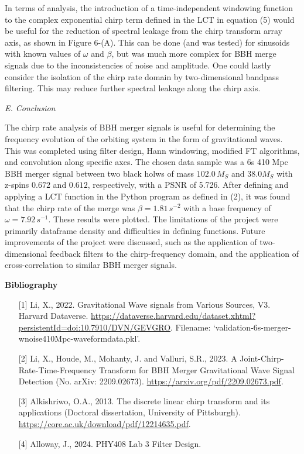 \documentclass[12pt]{article}
\begin{document}
\begin{multicols}{2}
In terms of analysis, the introduction of a time-independent windowing function to the complex exponential chirp term defined in the LCT in equation (5) would be useful for the reduction of spectral leakage from the chirp transform array axis, as shown in Figure 6-(A). This can be done (and was tested) for sinusoids with known values of $\omega$ and $\beta$, but was much more complex for BBH merge signals due to the inconsistencies of noise and amplitude. 
One could lastly consider the isolation of the chirp rate domain by two-dimensional bandpass filtering. This may reduce further spectral leakage along the chirp axis.

\begin{center}
    \textit{E. Conclusion}\\
\end{center}

The chirp rate analysis of BBH merger signals is useful for determining the frequency evolution of the orbiting system in the form of gravitational waves. This was completed using filter design, Hann windowing, modified FT algorithms, and convolution along specific axes. The chosen data sample was a 6s 410 Mpc BBH merger signal between two black holws of mass $102.0\, M_S$ and $38.0 M_S$ with z-spins $0.672$ and $0.612$, respectively, with a PSNR of 5.726. After defining and applying a LCT function in the Python program as defined in (2), it was found that the chirp rate of the merge was $\beta = 1.81\, s^{-2}$ with a base frequency of $\omega = 7.92\, s^{-1}$. These results were plotted. The limitations of the project were primarily dataframe density and difficulties in defining functions. Future improvements of the project were discussed, such as the application of two-dimensional feedback filters to the chirp-frequency domain, and the application of cross-correlation to similar BBH merger signals.





\end{multicols}


\pagebreak 

\textbf{Bibliography}
\begin{enumerate}
    \item[{[1]}] Li, X., 2022. Gravitational Wave signals from Various Sources, V3. Harvard Dataverse. \color{blue}\url{https://dataverse.harvard.edu/dataset.xhtml?persistentId=doi:10.7910/DVN/GEVGRO}\color{black}. Filename: `validation-6s-merger-wnoise410Mpc-waveform\textunderscore data.pkl'. 
    \item[{[2]}] Li, X., Houde, M., Mohanty, J. and Valluri, S.R., 2023. A Joint-Chirp-Rate-Time-Frequency Transform for BBH Merger Gravitational Wave Signal Detection (No. arXiv: 2209.02673). \color{blue}\url{https://arxiv.org/pdf/2209.02673.pdf}\color{black}.
    \item[{[3]}] Alkishriwo, O.A., 2013. The discrete linear chirp transform and its applications (Doctoral dissertation, University of Pittsburgh). \color{blue}\url{https://core.ac.uk/download/pdf/12214635.pdf}\color{black}.
    \item[{[4]}] Alloway, J., 2024. PHY408 Lab 3 Filter Design.
\end{enumerate}
\end{document}

